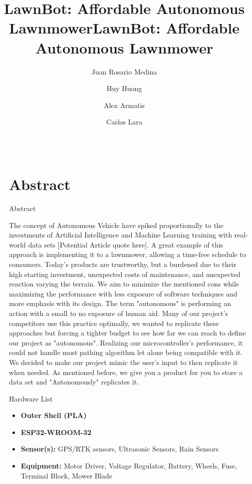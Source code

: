 \documentclass[final]{beamer}
\title{LawnBot: Affordable Autonomous Lawnmower}
\title{LawnBot: Affordable Autonomous Lawnmower}
\author{Juan Rosario Medina \inst{1} \and Huy Huong \inst{1} \and Alex Armatis \inst{1} \and Carlos Lara \inst{2}}
\institute[UB]{
    University of Bridgeport \inst{1} \\
    School of Computer Science \& Engineering \inst{2} 
}
\newlength{\sepwidth}
\newlength{\colwidth}
\newcommand{\separatorcolumn}{\begin{column}{\sepwidth}\end{column}}
\begin{document}
\begin{frame}[t]
\begin{columns}[t]
\separatorcolumn

\begin{column}{\colwidth}
\section{Abstract}
  \begin{block}{Abstract}

    The concept of Autonomous Vehicle have spiked proportionally to the investments of Artificial Intelligence and Machine Learning training with real-world data sets [Potential Article quote here]. A great example of this approach is implementing it to a lawnmower, allowing a time-free schedule to consumers. Today's products are trustworthy, but a burdened due to their high starting investment, unexpected costs of maintenance, and unexpected reaction varying the terrain. We aim to minimize the mentioned cons while maximizing the performance with less exposure of software techniques and more emphasis with its design. The term "autonomous" is performing an action with a small to no exposure of human aid. Many of our project's competitors use this practice optimally, we wanted to replicate these approaches but forcing a tighter budget to see how far we can reach to define our project as "autonomous". Realizing our microcontroller's performance, it could not handle most pathing algorithm let alone being compatible with it. We decided to make our project mimic the user's input to then replicate it when needed. As mentioned before, we give you a product for you to store a data set and "Autonomously" replicates it.


  \end{block}

  \begin{block}{Hardware List}
    \begin{itemize}
      \item \textbf{Outer Shell (PLA)}
      \item \textbf{ESP32-WROOM-32}
      \item \textbf{Sensor(s):} GPS/RTK sensors, Ultrasonic Sensors, Rain Sensors
      \item \textbf{Equipment:} Motor Driver, Voltage Regulator, Battery, Wheels, Fuse, Terminal Block, Mower Blade
    \end{itemize}


\end{block}
\end{column}
\end{columns}
\end{frame}
\end{document}
